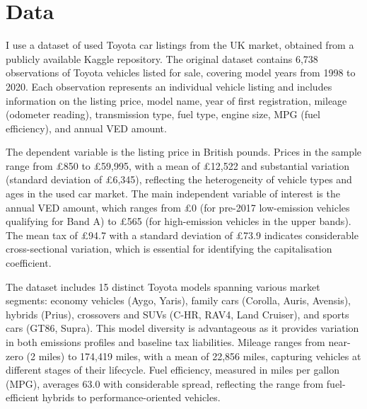 \documentclass[12pt, a4paper]{article}
\begin{document}
\section{Data}

I use a dataset of used Toyota car listings from the UK market, obtained from a publicly available Kaggle repository. The original dataset contains 6,738 observations of Toyota vehicles listed for sale, covering model years from 1998 to 2020. Each observation represents an individual vehicle listing and includes information on the listing price, model name, year of first registration, mileage (odometer reading), transmission type, fuel type, engine size, MPG (fuel efficiency), and annual VED amount.

The dependent variable is the listing price in British pounds. Prices in the sample range from \pounds 850 to \pounds 59,995, with a mean of \pounds 12,522 and substantial variation (standard deviation of \pounds 6,345), reflecting the heterogeneity of vehicle types and ages in the used car market. The main independent variable of interest is the annual VED amount, which ranges from \pounds 0 (for pre-2017 low-emission vehicles qualifying for Band A) to \pounds 565 (for high-emission vehicles in the upper bands). The mean tax of \pounds 94.7 with a standard deviation of \pounds 73.9 indicates considerable cross-sectional variation, which is essential for identifying the capitalisation coefficient.

The dataset includes 15 distinct Toyota models spanning various market segments: economy vehicles (Aygo, Yaris), family cars (Corolla, Auris, Avensis), hybrids (Prius), crossovers and SUVs (C-HR, RAV4, Land Cruiser), and sports cars (GT86, Supra). This model diversity is advantageous as it provides variation in both emissions profiles and baseline tax liabilities. Mileage ranges from near-zero (2 miles) to 174,419 miles, with a mean of 22,856 miles, capturing vehicles at different stages of their lifecycle. Fuel efficiency, measured in miles per gallon (MPG), averages 63.0 with considerable spread, reflecting the range from fuel-efficient hybrids to performance-oriented vehicles.
\end{document}
